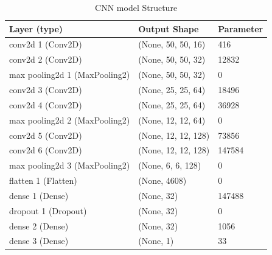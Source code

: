 \begin{table}[H]
\centering
\caption{CNN model Structure}
\begin{tabular}{|l|l|l|} 
\hline
Layer (type)              & Output Shape      & Parameter  \\ 
\hline
conv2d 1 (Conv2D)             & (None, 50, 50, 16) &  416 \\
\hline
conv2d 2 (Conv2D)        & (None, 50, 50, 32)                        & 12832        \\
\hline
max pooling2d 1 (MaxPooling2) &  (None, 50, 50, 32) &  0         \\
\hline
conv2d 3 (Conv2D)                                    & (None, 25, 25, 64)                        & 18496                            \\
\hline
conv2d 4 (Conv2D)             & (None, 25, 25, 64) & 36928     \\
\hline
max pooling2d 2 (MaxPooling2)                        & (None, 12, 12, 64)                        & 0                                \\
\hline
conv2d 5 (Conv2D)                                    & (None, 12, 12, 128)                       & 73856                            \\
\hline
conv2d 6 (Conv2D)                                    & (None, 12, 12, 128)                       & 147584                           \\
\hline
max pooling2d 3 (MaxPooling2)                        & (None, 6, 6, 128)                         & 0                                \\
\hline
flatten 1 (Flatten)                                  & (None, 4608)                              & 0                                \\
\hline
dense 1 (Dense)                                      & (None, 32)                                & 147488                           \\
\hline
dropout 1 (Dropout)                                  & (None, 32)                                & 0                                \\
\hline
dense 2 (Dense)                                      & (None, 32)                                & 1056                             \\
\hline
dense 3 (Dense)                                      & (None, 1)                                 & 33 \\
\hline
\end{tabular}
\end{table}

